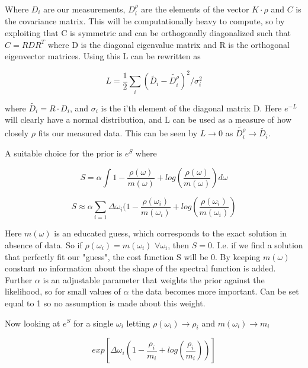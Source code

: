 \documentclass[a4paper, oneside, 12pt]{book}
\begin{document}
Where $D_{i}$ are our measurements, $D_{i}^{\rho}$ are the elements of the vector $K\cdot\rho$ and $C$ is the covariance matrix. This will be computationally heavy to compute, so by exploiting that C is symmetric and can be orthogonally diagonalized such that $C=RDR^{T}$ where D is the diagonal eigenvalue matrix and R is the orthogonal eigenvector matrices.
Using this L can be rewritten as

\begin{equation}
L=\frac{1}{2} \sum_{i} (\tilde{D_{i}} - \tilde{D_{i}^{\rho}})^{2}/ \sigma_{i}^{2}
\end{equation}

where $\tilde{D_{i}}=R \cdot D_{i}$, and $\sigma_{i}$ is the i'th element of the diagonal matrix D. Here $e^{-L}$ will clearly have a normal distribution, and L can be used as a measure of how closely $\rho$ fits our measured data. This can be seen by $L \rightarrow 0$ as $\tilde{D_{i}^{\rho}} \rightarrow \tilde{D_{i}}$.

A suitable choice for the prior is $e^{S}$ where

\begin{equation}
S=\alpha\int 1-\frac{\rho(\omega)}{m(\omega)}+log(\frac{\rho(\omega)}{m(\omega)})d\omega
\end{equation}

\begin{equation}
S \approx \alpha \sum_{i=1}\Delta\omega_{i}(1-\frac{\rho(\omega_{i})}{m(\omega_{i})}+log(\frac{\rho(\omega_{i})}{m(\omega_{i})}) 
\end{equation}


Here $m(\omega)$ is an educated guess, which corresponds to the exact solution in absence of data. So if $\rho(\omega_{i})=m(\omega_{i})$ $\forall\omega_{i}$,  then $S=0$. I.e. if we find a solution that perfectly fit our "guess", the cost function S will be 0. By keeping $m(\omega)$ constant no information about the shape of the spectral function is added. Further $\alpha$ is an adjustable parameter that weights the prior against the likelihood, so for small values of $\alpha$ the data becomes more important. Can be set equal to 1 so no assumption is made about this weight.


Now looking at $e^{S}$ for a single $\omega_{i}$ letting $\rho(\omega_{i}) \rightarrow \rho_{i}$ and $m(\omega_{i}) \rightarrow m_{i}$

\begin{equation} 
exp[\Delta\omega_{i}(1-\frac{\rho_{i}}{m_{i}}+log(\frac{\rho_{i}}{m_{i}}))]
\end{equation}
\end{document}
